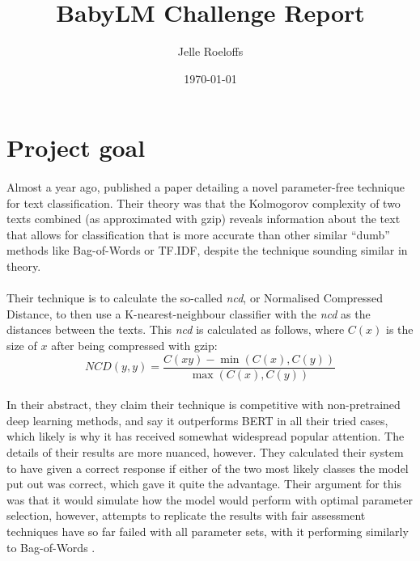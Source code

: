 \documentclass[11pt]{article}
\title{ BabyLM Challenge Report }
\author{ Jelle Roeloffs }
\date{\today}
\begin{document}
\maketitle

\section{Project goal}

\paragraph{}
Almost a year ago, \textcite{jiang2023zip} published a paper detailing a novel parameter-free technique for text classification. Their theory was that the Kolmogorov complexity of two texts combined (as approximated with gzip) reveals information about the text that allows for classification that is more accurate than other similar ``dumb'' methods like Bag-of-Words or TF.IDF, despite the technique sounding similar in theory.

\paragraph{}
Their technique is to calculate the so-called \textit{ncd}, or Normalised Compressed Distance, to then use a K-nearest-neighbour classifier with the \textit{ncd} as the distances between the texts. This \textit{ncd} is calculated as follows, where $C(x)$ is the size of $x$ after being compressed with gzip:
$$ NCD(y, y) = \frac{C(xy) - \min(C(x),C(y))}{\max(C(x), C(y))} $$

\paragraph{}
In their abstract, they claim their technique is competitive with non-pretrained deep learning methods, and say it outperforms BERT in all their tried cases, which likely is why it has received somewhat widespread popular attention. The details of their results are more nuanced, however. They calculated their system to have given a correct response if either of the two most likely classes the model put out was correct, which gave it quite the advantage. Their argument for this was that it would simulate how the model would perform with optimal parameter selection, however, attempts to replicate the results with fair assessment techniques have so far failed with all parameter sets, with it performing similarly to Bag-of-Words \parencite{opitz2023gzip}.
\end{document}
